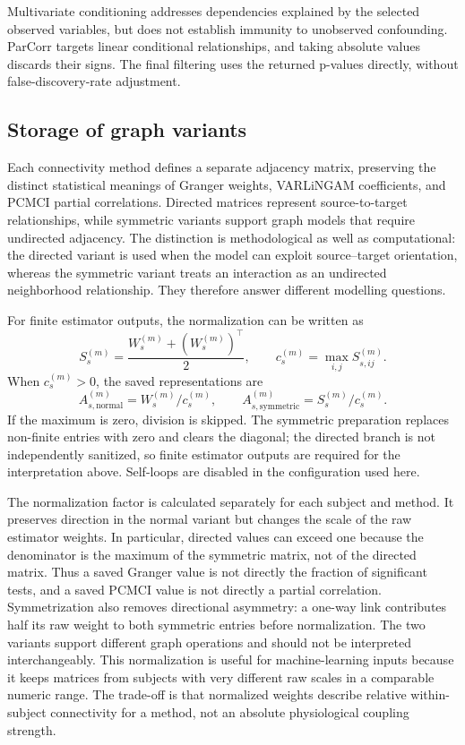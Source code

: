 \documentclass[11pt,a4paper]{article}
\begin{document}
Multivariate conditioning addresses dependencies explained by the selected
observed variables, but does not establish immunity to unobserved
confounding. ParCorr targets linear conditional relationships, and taking
absolute values discards their signs. The final filtering uses the returned
p-values directly, without false-discovery-rate adjustment.

\subsection{Storage of graph variants}

Each connectivity method defines a separate adjacency matrix, preserving
the distinct statistical meanings of Granger weights, VARLiNGAM coefficients,
and PCMCI partial correlations. Directed matrices represent source-to-target
relationships, while symmetric variants support graph models that require
undirected adjacency.
The distinction is methodological as well as computational: the directed
variant is used when the model can exploit source--target orientation, whereas
the symmetric variant treats an interaction as an undirected neighborhood
relationship. They therefore answer different modelling questions.

For finite estimator outputs, the normalization can be written as
\[
    S_s^{(m)}=\frac{W_s^{(m)}+(W_s^{(m)})^\top}{2},
    \qquad c_s^{(m)}=\max_{i,j}S_{s,ij}^{(m)}.
\]
When $c_s^{(m)}>0$, the saved representations are
\[
    A_{s,\mathrm{normal}}^{(m)}=W_s^{(m)}/c_s^{(m)},
    \qquad
    A_{s,\mathrm{symmetric}}^{(m)}=S_s^{(m)}/c_s^{(m)}.
\]
If the maximum is zero, division is skipped. The symmetric preparation
replaces non-finite entries with zero and clears the diagonal; the directed
branch is not independently sanitized, so finite estimator outputs are
required for the interpretation above. Self-loops are disabled in the
configuration used here.

The normalization factor is calculated separately for each subject and
method. It preserves direction in the normal variant but changes the scale
of the raw estimator weights. In particular, directed values can exceed
one because the denominator is the maximum of the symmetric matrix, not
of the directed matrix. Thus a saved Granger value is not directly the
fraction of significant tests, and a saved PCMCI value is not directly a
partial correlation. Symmetrization also removes directional asymmetry:
a one-way link contributes half its raw weight to both symmetric entries
before normalization. The two variants support different graph operations
and should not be interpreted interchangeably.
This normalization is useful for machine-learning inputs because it keeps
matrices from subjects with very different raw scales in a comparable numeric
range. The trade-off is that normalized weights describe relative within-
subject connectivity for a method, not an absolute physiological coupling
strength.
\end{document}
